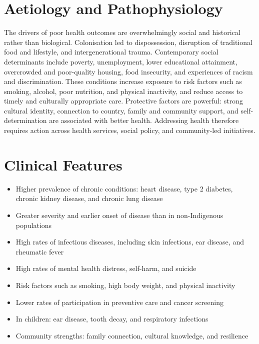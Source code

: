 \section*{Aetiology and Pathophysiology}
The drivers of poor health outcomes are overwhelmingly social and historical rather than biological. Colonisation led to dispossession, disruption of traditional food and lifestyle, and intergenerational trauma. Contemporary social determinants include poverty, unemployment, lower educational attainment, overcrowded and poor-quality housing, food insecurity, and experiences of racism and discrimination. These conditions increase exposure to risk factors such as smoking, alcohol, poor nutrition, and physical inactivity, and reduce access to timely and culturally appropriate care. Protective factors are powerful: strong cultural identity, connection to country, family and community support, and self-determination are associated with better health. Addressing health therefore requires action across health services, social policy, and community-led initiatives.

\section*{Clinical Features}
\begin{itemize}
    \item Higher prevalence of chronic conditions: heart disease, type 2 diabetes, chronic kidney disease, and chronic lung disease
    \item Greater severity and earlier onset of disease than in non-Indigenous populations
    \item High rates of infectious diseases, including skin infections, ear disease, and rheumatic fever
    \item High rates of mental health distress, self-harm, and suicide
    \item Risk factors such as smoking, high body weight, and physical inactivity
    \item Lower rates of participation in preventive care and cancer screening
    \item In children: ear disease, tooth decay, and respiratory infections
    \item Community strengths: family connection, cultural knowledge, and resilience
\end{itemize}

